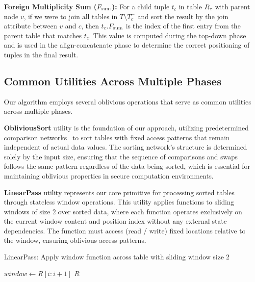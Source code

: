 \textbf{Foreign Multiplicity Sum ($F_{\text{sum}}$):} For a child tuple $t_c$ in table $R_c$ with parent node $v$, if we were to join all tables in $T \setminus T_c^{-}$ and sort the result by the join attribute between $v$ and $c$, then $t_c.F_{\text{sum}}$ is the index of the first entry from the parent table that matches $t_c$. This value is computed during the top-down phase and is used in the align-concatenate phase to determine the correct positioning of tuples in the final result.

\subsection{Common Utilities Across Multiple Phases}

Our algorithm employs several oblivious operations that serve as common utilities across multiple phases.

\textbf{ObliviousSort} utility is the foundation of our approach, utilizing predetermined comparison networks~\cite{batcher1968} to sort tables with fixed access patterns that remain independent of actual data values. The sorting network's structure is determined solely by the input size, ensuring that the sequence of comparisons and swaps follows the same pattern regardless of the data being sorted, which is essential for maintaining oblivious properties in secure computation environments.

\textbf{LinearPass} utility represents our core primitive for processing sorted tables through stateless window operations. This utility applies functions to sliding windows of size 2 over sorted data, where each function operates exclusively on the current window content and position index without any external state dependencies. The function must access (read / write) fixed locations relative to the window, ensuring oblivious access patterns.

\begin{algorithm}[H]
\caption{LinearPass: Apply window function across table with sliding window size 2}
\label{alg:linear-pass}
\begin{algorithmic}[1]
        \State $window \leftarrow R[i : i + 1]$ 
        \State {} 
    \EndFor
    \State \Return $R$ 
\EndFunction
\end{algorithmic}
\end{algorithm}

